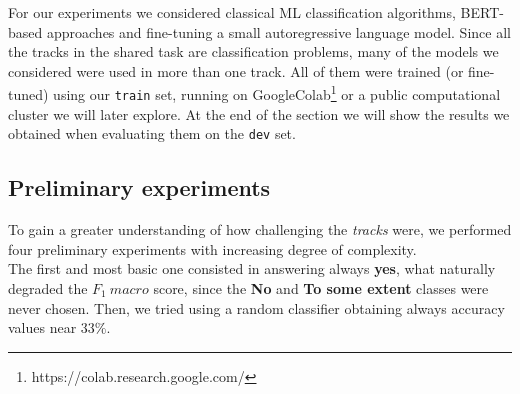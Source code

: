 \documentclass[11pt]{article}
\begin{document}
For our experiments we considered classical ML classification algorithms, BERT-based approaches and fine-tuning a small autoregressive language model.
Since all the tracks in the shared task are classification problems, many of the models we considered were used in more than one track.
All of them were trained (or fine-tuned) using our \texttt{train} set, running on GoogleColab\footnote{https://colab.research.google.com/} or a public computational cluster we will later explore. 
At the end of the section we will show the results we obtained when evaluating them on the \texttt{dev} set.


\subsection{Preliminary experiments}

To gain a greater understanding of how challenging the \textit{tracks} were, we performed four preliminary experiments with increasing degree of complexity.\\

The first and most basic one consisted in answering always \textbf{yes}, what naturally degraded the $F_1\ macro$ score, since the \textbf{No} and \textbf{To some extent} classes were never chosen.
Then, we tried using a random classifier obtaining always accuracy values near $33 \%$.
\end{document}
